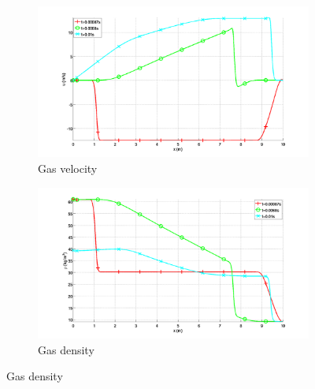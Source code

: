 \documentclass{mc2015}
\begin{document}
\begin{figure}[H]
        \centering
        \begin{subfigure}[b]{0.5\textwidth}
                \centering
                \includegraphics[width=\textwidth]{figures/Plot_velocity_gas_phase.png}
                \caption{Gas velocity}
                \label{fig:vap-phase-vel}
        \end{subfigure}%
        \begin{subfigure}[b]{0.5\textwidth}
                \centering
                \includegraphics[width=\textwidth]{figures/Plot_density_gas_phase.png}
                \caption{Gas density}
                \label{fig:vap-phase-density}
        \end{subfigure}
        

\end{figure}
\end{document}
